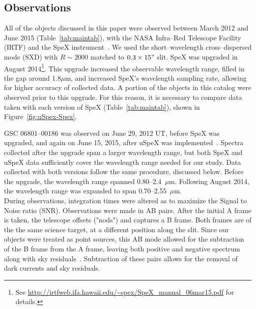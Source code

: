 \subsection{Observations}
All of the objects discussed in this paper were observed between 
March 2012 and June 2015 (Table~\ref{tab:maintab}), with the 
NASA Infra--Red Telescope Facility (IRTF) and the SpeX 
instrument~\cite{Rayner_1998}. We used the short--wavelength cross--dispersed 
mode (SXD) with $R ∼ 2000$ matched to $0.3\times15"$ slit.  SpeX was upgraded in August 2014\footnote{See \url{http://irtfweb.ifa.hawaii.edu/~spex/SpeX_manual_06mar15.pdf} for details.}. 
This upgrade increased the observable wavelength range, filled 
in the gap around 1.8$\mu$m, and increased SpeX's wavelength 
sampling rate, allowing for higher accuracy of collected data.
A portion of the objects in this catalog were observed prior to this upgrade.  
For this reason, it is necessary to compare data taken with each version of SpeX (Table~\ref{tab:maintab}), 
shown in Figure~\ref{fig:uSpex-Spex}.



GSC 06801--00186 was observed on June 29, 
2012 UT, before SpeX was upgraded, and again on June 15, 2015, after uSpeX 
was implemented~\cite{Spextool_Manual_Cushing_2015}.  Spectra collected after 
the upgrade span a larger wavelength range, but both SpeX and uSpeX data sufficiently 
cover the wavelength range needed for our study.  Data collected with both versions 
follow the same procedure, discussed below.  Before the upgrade, the wavelength 
range spanned 0.80--2.4~$\mu$m.  Following August 2014, the wavelength range 
was expanded to span 0.70--2.55~$\mu$m.\\

 



During observations, integration times were altered as to maximize the Signal to Noise ratio (SNR).  
Observations were made in AB pairs.  After the initial A frame is taken, the telescope offsets ("nods") and captures a B frame.  Both frames are of the the same science target, at a different position along the slit.  Since our objects were treated as point sources, this AB mode allowed for the subtraction of the B frame from the A frame, leaving both positive and negative spectrum along with sky residuals~\cite{Cushing_2004}. Subtraction of these pairs allows for the removal of dark currents and sky residuals.



